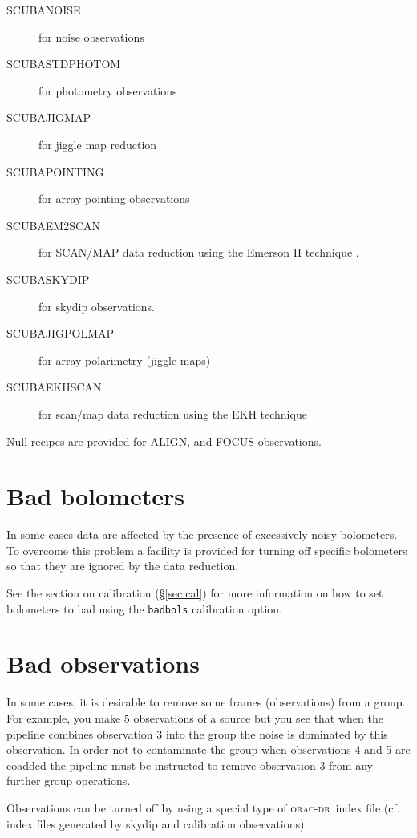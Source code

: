 \documentclass[twoside,11pt]{article}
\newcommand{\xref}[3]{#1}
\newcommand{\xlabel}[1]{}
\renewcommand{\_}{\texttt{\symbol{95}}}
\newcommand{\oracdr}{\xref{\textsc{orac-dr}}{sun230}{}}
\newcommand{\recipe}[1]{{\small\textsf{#1}}}
\begin{document}
\begin{description}
\item[\recipe{SCUBA\_NOISE}] for noise observations
\item[\recipe{SCUBA\_STD\_PHOTOM}] for photometry observations
\item[\recipe{SCUBA\_JIGMAP}] for jiggle map reduction
\item[\recipe{SCUBA\_POINTING}] for array pointing observations
\item[\recipe{SCUBA\_EM2SCAN}] for SCAN/MAP data reduction using the Emerson II
technique \cite{EII}.
\item[\recipe{SCUBA\_SKYDIP}] for skydip observations.
\item[\recipe{SCUBA\_JIGPOLMAP}] for array polarimetry (jiggle maps)
\item[\recipe{SCUBA\_EKHSCAN}] for scan/map data reduction using the EKH \cite{ekh} technique
\end{description}

Null recipes are provided for ALIGN, and FOCUS observations.


\section{Bad bolometers\xlabel{bad_bolometers}}

In some cases data are affected by the presence of excessively noisy
bolometers. To overcome this problem a facility is provided for turning
off specific bolometers so that they are ignored by the data reduction.

See the section on calibration (\S\ref{sec:cal}) for more information on how
to set bolometers to bad using the \texttt{badbols} calibration option.


\section{Bad observations\xlabel{bad_observations}}

In some cases, it is desirable to remove some frames (observations)
from a group. For example, you make 5 observations of a source
but you see that when the pipeline combines observation 3 into the
group the noise is dominated by this observation. In order
not to contaminate the group when observations 4 and 5 are coadded
the pipeline must be instructed to remove observation 3 from any further
group operations.

Observations can be turned off by using a special type of
\oracdr\ index file (cf. index files generated by skydip and
calibration observations).
\end{document}
